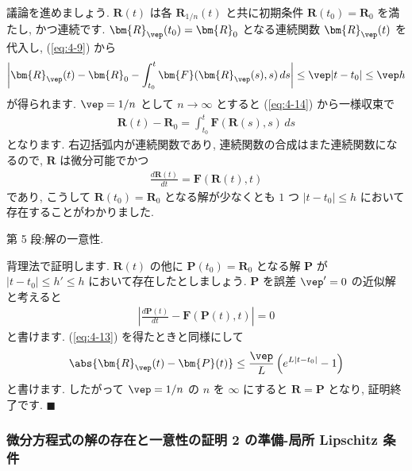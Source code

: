 \documentclass[openany, a4paper, oneside]{jsbook}
\begin{document}
議論を進めましょう.
$\bm{R}(t)$ は各 $\bm{R}_{1/n}(t)$ と共に初期条件 $\bm{R}(t_0)=\bm{R}_0$ を満たし, かつ連続です.
$\bm{R}_{\vep}(t_0)=\bm{R}_0$ となる連続関数 $\bm{R}_{\vep}(t)$ を代入し, (\ref{eq:4-9}) から
\begin{gather}
\left| \bm{R}_{\vep}(t) - \bm{R}_0 - \int_{t_0}^t \bm{F} (\bm{R}_{\vep} (s) , s ) \, ds \right|
\leq
\vep | t - t_0 |
\leq
\vep h
\end{gather}
が得られます.
$\vep = 1/n$ として $n\to \infty$ とすると (\ref{eq:4-14}) から一様収束で
\begin{gather}
\bm{R}(t) - \bm{R}_0
=
\int_{t_0}^t \bm{F} ( \bm{R}(s) , s ) \, ds
\end{gather}
となります.
右辺括弧内が連続関数であり, 連続関数の合成はまた連続関数になるので,
$\bm{R}$ は微分可能でかつ
\begin{gather}
\frac{d \bm{R} (t)} {dt}
=
\bm{F} ( \bm{R}(t) , t )
\end{gather}
であり, こうして $\bm{R}(t_0) = \bm{R}_0$ となる解が少なくとも $1$ つ $| t - t_0 |\leq h$ において
存在することがわかりました.

第 5 段:解の一意性.

背理法で証明します.
$\bm{R}(t)$ の他に $\bm{P}(t_0) = \bm{R}_0$ となる解 $\bm{P}$ が
$|t-t_0| \leq h' \leq h$ において存在したとしましょう.
$\bm{P}$ を誤差 $\vep '=0$ の近似解と考えると
\begin{gather}
\left| \frac{d \bm{P} (t)} {dt} - \bm{F} ( \bm{P}(t) , t ) \right|
=
0
\end{gather}
と書けます.
(\ref{eq:4-13}) を得たときと同様にして
\begin{gather}
\abs{\bm{R}_{\vep} (t) - \bm{P}(t)}
\leq
\frac{\vep} {L} \left ( e^{L | t - t_0 |} - 1 \right)
\end{gather}
と書けます.
したがって $\vep = 1/n$ の $n$ を $\infty$ にすると $\bm{R}=\bm{P}$
となり, 証明終了です.  $\blacksquare$
\subsubsection{微分方程式の解の存在と一意性の証明 2 の準備-局所 Lipschitz 条件}
\end{document}
